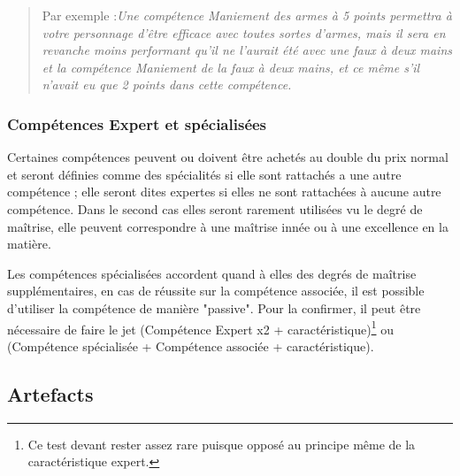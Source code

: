 \begin{quote}
Par exemple :\it Une compétence Maniement des armes à 5 points permettra à votre personnage d'être efficace avec toutes sortes d'armes, 
mais il sera en revanche moins performant qu'il ne l'aurait été avec une faux à deux mains et la compétence Maniement de la faux à deux mains, 
et ce même s'il n'avait eu que 2 points dans cette compétence.
\end{quote} 

\subsubsection{Compétences Expert et spécialisées}
Certaines compétences peuvent ou doivent être achetés au double du prix normal et seront définies comme des spécialités 
si elle sont rattachés a une autre compétence ; elle seront dites expertes si elles ne sont rattachées à aucune autre compétence. 
Dans le second cas elles seront rarement utilisées vu le degré de maîtrise, elle peuvent correspondre à une maîtrise innée ou à une excellence en la matière.

Les compétences spécialisées accordent quand à elles des degrés de maîtrise supplémentaires, en cas de réussite sur la compétence associée, 
il est possible d'utiliser la compétence de manière "passive". Pour la confirmer, il peut être nécessaire de faire le jet 
(Compétence Expert x2 + caractéristique)\footnote{Ce test devant rester assez rare puisque opposé au principe même de la caractéristique expert.}
 ou (Compétence spécialisée + Compétence associée + caractéristique).

\subsection{Artefacts}

